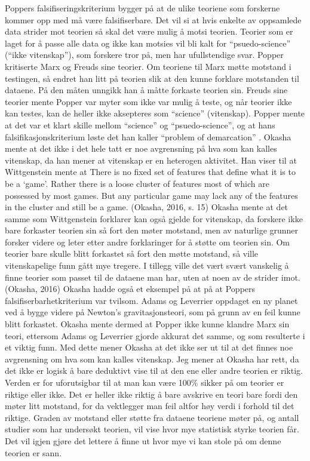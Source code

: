 \documentclass[
]{book}
\begin{document}
Poppers falsifiseringskriterium bygger på at de ulike teoriene som forskerne kommer opp med må være falsifiserbare. Det vil si at hvis enkelte av oppsamlede data strider mot teorien så skal det være mulig å motsi teorien. Teorier som er laget for å passe alle data og ikke kan motsies vil bli kalt for ``psuedo-science'' (``ikke vitenskap''), som forskere tror på, men har ufullstendige svar. Popper kritiserte Marx og Freuds sine teorier. Om teoriene til Marx møtte motstand i testingen, så endret han litt på teorien slik at den kunne forklare motstanden til dataene. På den måten unngikk han å måtte forkaste teorien sin. Freuds sine teorier mente Popper var myter som ikke var mulig å teste, og når teorier ikke kan testes, kan de heller ikke aksepteres som ``science'' (vitenskap). Popper mente at det var et klart skille mellom ``science'' og ``psuedo-science'', og at hans falsifikasjonskriterium løste det han kaller ``problem of demarcation'' \citep{okasha2016, popper1969}. Okasha mente at det ikke i det hele tatt er noe avgrensning på hva som kan kalles vitenskap, da han mener at vitenskap er en heterogen aktivitet. Han viser til at Wittgenstein mente at There is no fixed set of features that define what it is to be a `game'. Rather there is a loose cluster of features most of which are possessed by most games. But any particular game may lack any of the features in the cluster and still be a game. (Okasha, 2016, s. 15) Okasha mente at det samme som Wittgenstein forklarer kan også gjelde for vitenskap, da forskere ikke bare forkaster teorien sin så fort den møter motstand, men av naturlige grunner forsker videre og leter etter andre forklaringer for å støtte om teorien sin. Om teorier bare skulle blitt forkastet så fort den møtte motstand, så ville vitenskapelige funn gått mye tregere. I tillegg ville det vært svært vanskelig å finne teorier som passet til de dataene man har, uten at noen av de strider imot. (Okasha, 2016) Okasha hadde også et eksempel på at på at Poppers falsifiserbarhetkriterium var tvilsom. Adams og Leverrier oppdaget en ny planet ved å bygge videre på Newton's gravitasjonsteori, som på grunn av en feil kunne blitt forkastet. Okasha mente dermed at Popper ikke kunne klandre Marx sin teori, ettersom Adams og Leverrier gjorde akkurat det samme, og som resulterte i et viktig funn. Med dette mener Okasha at det ikke ser ut til at det finnes noe avgrensning om hva som kan kalles vitenskap. Jeg mener at Okasha har rett, da det ikke er logisk å bare deduktivt vise til at den ene eller andre teorien er riktig. Verden er for uforutsigbar til at man kan være 100\% sikker på om teorier er riktige eller ikke. Det er heller ikke riktig å bare avskrive en teori bare fordi den møter litt motstand, for da vektlegger man feil altfor høy verdi i forhold til det riktige. Graden av motstand eller støtte fra dataene teoriene møter på, og antall studier som har undersøkt teorien, vil vise hvor mye statistisk styrke teorien får. Det vil igjen gjøre det lettere å finne ut hvor mye vi kan stole på om denne teorien er sann.
\end{document}
